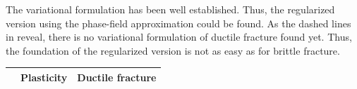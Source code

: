 \begin{table}[!ht]
\begin{center}
\begin{tabular}{|c||c|c|c|}
		\hline
	\end{tabular}
	\end{center}
 \label{fig:elastic}
\end{table}
The variational formulation has been well established. Thus, the regularized version using the phase-field approximation could be found. As the dashed lines in  reveal, there is no variational formulation of ductile fracture found yet. Thus, the foundation of the regularized version is not as easy as for brittle fracture.

\begin{table}[!ht]
	\begin{center}
	\begin{tabular}{|c||c|c|c|}
		\cline{2-4}
			\multicolumn{1}{c||}{}& Plasticity & \multicolumn{2}{c|}{Ductile fracture} \\
 		\hline\hline

\end{tabular}
\end{center}
\end{table}
